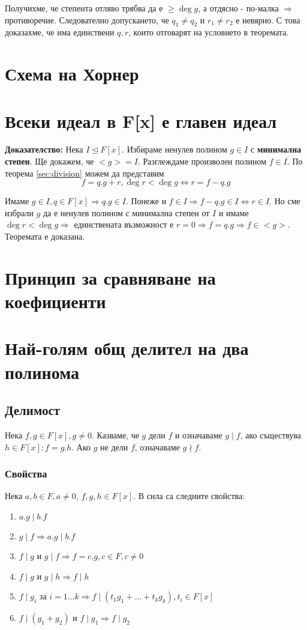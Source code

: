 \documentclass[fleqn,12pt]{article}
\begin{document}
Получихме, че степента отляво трябва да е $\geq \deg g$, а отдясно - по-малка
$\Rightarrow$ противоречие. Следователно допускането, че $q_1 \neq q_2$ и $r_1 \neq r_2$ е невярно.
С това доказахме, че има единствени $q,r$, които отговарят на условието в теоремата.


\section{Схема на Хорнер}

\section{Всеки идеал в F[x] е главен идеал}
\textbf{Доказателство: } Нека $I \trianglelefteq F[x]$. Избираме ненулев полином $g \in I$ с \textbf{минимална степен}.
Ще докажем, че $<g> = I$.
Разглеждаме произволен полином $f \in I$. По теорема \ref{sec:division} можем да представим 
\[ f = q.g + r, \deg r < \deg g \Leftrightarrow r = f - q.g \]

Имаме $g \in I, q \in F[x] \Rightarrow q.g \in I$. Понеже и $f \in I \Rightarrow f - q.g \in I \Leftrightarrow r \in I$.
Но сме избрали $g$ да е ненулев полином с минимална степен от $I$ и имаме $\deg r < \deg g \Rightarrow$ единствената възможност
е $r = 0 \Rightarrow f = q.g \Rightarrow f \in <g>$. Теоремата е доказана.

\section{Принцип за сравняване на коефициенти}

\section{Най-голям общ делител на два полинома}
\subsection{Делимост}
Нека $f,g \in F[x], g \neq 0$. Казваме, че $g$ дели $f$ и означаваме $g \mid f$,
ако съществува $h \in F[x] : f = g.h$. Ако $g$ не дели $f$, означаваме $g \nmid f$.

\subsubsection{Свойства}
Нека $a,b \in F, a \neq 0$, $f,g,h \in F[x]$. В сила са следните свойства:
\begin{enumerate}
    \item $a.g \mid b.f$
    \item $g \mid f \Rightarrow a.g \mid b.f$
    \item $f \mid g$ и $g \mid f \Rightarrow f = c.g, c \in F, c\neq 0$
    \item $f \mid g$ и $g \mid h \Rightarrow f \mid h$
    \item $f \mid g_i$ за $i = 1 \dots k \Rightarrow f \mid (t_1 g_1 + \dots + t_k g_k), t_i \in F[x]$
    \item \label{div_prop:sum} $f \mid (g_1 + g_2)$ и $f \mid g_1 \Rightarrow f \mid g_2$ 
\end{enumerate} 
\end{document}
